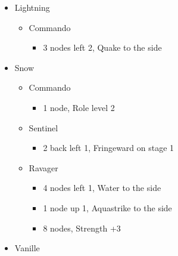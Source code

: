 \begin{paracol}{2}
\begin{menu}
\begin{itemize}
\begin{itemize}
\begin{itemize}
				      \end{itemize}
				      {\paradigmline[1]{\textit{\com}}{\textit{\syn}}{\textit{(\com)}}}%
				      {\paradigmline{(\rav)}{\rav}{\rav}}%
				      {\paradigmline{(\com)}{\syn}{\sen}}%
				      {\paradigmline{[\rav]}{(\rav)}{(\rav)}}%
				      {\paradigmline{\com}{[\com]}{\com}}%
				      {\paradigmline{\com}{[\com]}{\com}}
			\end{itemize}
			\crystarium
			\begin{itemize}
				\item Lightning
				      \begin{itemize}
					      \item Commando
					            \begin{itemize}
						            \item 3 nodes left 2, Quake to the side
					            \end{itemize}
				      \end{itemize}
				\item Snow
				      \begin{itemize}
					      \item Commando
					            \begin{itemize}
						            \item 1 node, Role level 2
					            \end{itemize}
					      \item Sentinel
					            \begin{itemize}
						            \item 2 back left 1, Fringeward on stage 1
					            \end{itemize}
					      \item Ravager
					            \begin{itemize}
						            \item 4 nodes left 1, Water to the side
						            \item 1 node up 1, Aquastrike to the side
						            \item 8 nodes, Strength +3
					            \end{itemize}
				      \end{itemize}
			\end{itemize}
			\equip
			\begin{itemize}
				\item Vanille
				      \begin{itemize}

\end{itemize}
\end{itemize}
\end{itemize}
\end{menu}
\end{paracol}
